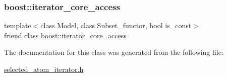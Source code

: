 \subsubsection{\texorpdfstring{boost\+::iterator\+\_\+core\+\_\+access}{boost::iterator\_core\_access}}
{\footnotesize\ttfamily template$<$class Model, class Subset\+\_\+functor, bool is\+\_\+const$>$ \\
friend class boost\+::iterator\+\_\+core\+\_\+access\hspace{0.3cm}{\ttfamily [friend]}}



The documentation for this class was generated from the following file\+:\begin{DoxyCompactItemize}
\item 
\hyperlink{selected__atom__iterator_8h}{selected\+\_\+atom\+\_\+iterator.\+h}\end{DoxyCompactItemize}

